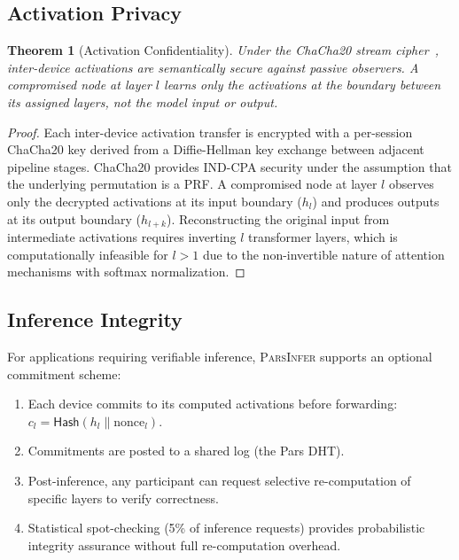 \documentclass[11pt,a4paper]{article}
\newcommand{\parsdi}{\textsc{ParsInfer}\xspace}
\newtheorem{theorem}{Theorem}
\begin{document}
\subsection{Activation Privacy}

\begin{theorem}[Activation Confidentiality]
Under the ChaCha20 stream cipher~\citep{bernstein2008chacha}, inter-device activations are semantically secure against passive observers. A compromised node at layer $l$ learns only the activations at the boundary between its assigned layers, not the model input or output.
\end{theorem}

\begin{proof}
Each inter-device activation transfer is encrypted with a per-session ChaCha20 key derived from a Diffie-Hellman key exchange between adjacent pipeline stages. ChaCha20 provides IND-CPA security under the assumption that the underlying permutation is a PRF. A compromised node at layer $l$ observes only the decrypted activations at its input boundary ($h_l$) and produces outputs at its output boundary ($h_{l+k}$). Reconstructing the original input from intermediate activations requires inverting $l$ transformer layers, which is computationally infeasible for $l > 1$ due to the non-invertible nature of attention mechanisms with softmax normalization.
\end{proof}

\subsection{Inference Integrity}

For applications requiring verifiable inference, \parsdi supports an optional commitment scheme:

\begin{enumerate}
    \item Each device commits to its computed activations before forwarding: $c_l = \mathsf{Hash}(h_l \| \text{nonce}_l)$.
    \item Commitments are posted to a shared log (the Pars DHT).
    \item Post-inference, any participant can request selective re-computation of specific layers to verify correctness.
    \item Statistical spot-checking (5\% of inference requests) provides probabilistic integrity assurance without full re-computation overhead.
\end{enumerate}
\end{document}
